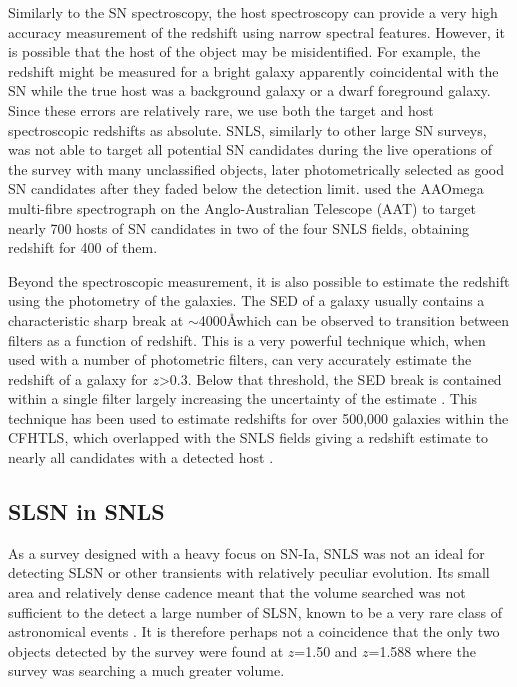 Similarly to the SN spectroscopy, the host spectroscopy can provide a very high accuracy measurement of the redshift using narrow spectral features. However, it is possible that the host of the object may be misidentified. For example, the redshift might be measured for a bright galaxy apparently coincidental with the SN while the true host was a background galaxy or a dwarf foreground galaxy. Since these errors are relatively rare, we use both the target and host spectroscopic redshifts as absolute. SNLS, similarly to other large SN surveys, was not able to target all potential SN candidates during the live operations of the survey with many unclassified objects, later photometrically selected as good SN candidates after they faded below the detection limit. \citet{Lidman2012} used the AAOmega multi-fibre spectrograph on the Anglo-Australian Telescope (AAT) to target nearly 700 hosts of SN candidates in two of the four SNLS fields, obtaining redshift for 400 of them.

Beyond the spectroscopic measurement, it is also possible to estimate the redshift using the photometry of the galaxies. The SED of a galaxy usually contains a characteristic sharp break at $\sim$4000\AA which can be observed to transition between filters as a function of redshift. This is a very powerful technique which, when used with a number of photometric filters, can very accurately estimate the redshift of a galaxy for $z$>0.3. Below that threshold, the SED break is contained within a single filter largely increasing the uncertainty of the estimate \citep{Connolly1995}. This technique has been used to estimate redshifts for over 500,000 galaxies within the CFHTLS, which overlapped with the SNLS fields giving a redshift estimate to nearly all candidates with a detected host \citep{Ilbert2006}.

\subsection{SLSN in SNLS}
As a survey designed with a heavy focus on SN-Ia, SNLS was not an ideal for detecting SLSN or other transients with relatively peculiar evolution. Its small area and relatively dense cadence meant that the volume searched was not sufficient to the detect a large number of SLSN, known to be a very rare class of astronomical events \citep{Cooke2012,Prajs2016,Quimby2013}. It is therefore perhaps not a coincidence that the only two objects detected by the survey were found at $z$=1.50 and $z$=1.588 where the survey was searching a much greater volume.

